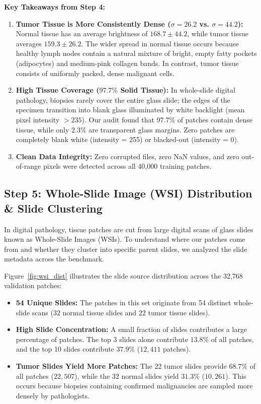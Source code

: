 \documentclass[11pt,a4paper]{article}
\begin{document}
\noindent\textbf{Key Takeaways from Step 4:}
\begin{enumerate}[noitemsep]
    \item \textbf{Tumor Tissue is More Consistently Dense ($\sigma = 26.2$ vs. $\sigma = 44.2$):}
    Normal tissue has an average brightness of $168.7 \pm 44.2$, while tumor tissue averages $159.3 \pm 26.2$. The wider spread in normal tissue occurs because healthy lymph nodes contain a natural mixture of bright, empty fatty pockets (adipocytes) and medium-pink collagen bands. In contrast, tumor tissue consists of uniformly packed, dense malignant cells.
    \item \textbf{High Tissue Coverage ($97.7\%$ Solid Tissue):}
    In whole-slide digital pathology, biopsies rarely cover the entire glass slide; the edges of the specimen transition into blank glass illuminated by white backlight (mean pixel intensity $> 235$). Our audit found that $97.7\%$ of patches contain dense tissue, while only $2.3\%$ are transparent glass margins. Zero patches are completely blank white (intensity = 255) or blacked-out (intensity = 0).
    \item \textbf{Clean Data Integrity:}
    Zero corrupted files, zero NaN values, and zero out-of-range pixels were detected across all 40,000 training patches.
\end{enumerate}

\subsection{Step 5: Whole-Slide Image (WSI) Distribution \& Slide Clustering}
In digital pathology, tissue patches are cut from large digital scans of glass slides known as Whole-Slide Images (WSIs). To understand where our patches come from and whether they cluster into specific parent slides, we analyzed the slide metadata across the benchmark.

Figure~\ref{fig:wsi_dist} illustrates the slide source distribution across the 32,768 validation patches:
\begin{itemize}[noitemsep]
    \item \textbf{54 Unique Slides:} The patches in this set originate from 54 distinct whole-slide scans (32 normal tissue slides and 22 tumor tissue slides).
    \item \textbf{High Slide Concentration:} A small fraction of slides contributes a large percentage of patches. The top 3 slides alone contribute $13.8\%$ of all patches, and the top 10 slides contribute $37.9\%$ ($12,411$ patches).
    \item \textbf{Tumor Slides Yield More Patches:} The 22 tumor slides provide $68.7\%$ of all patches ($22,507$), while the 32 normal slides yield $31.3\%$ ($10,261$). This occurs because biopsies containing confirmed malignancies are sampled more densely by pathologists.
\end{itemize}
\end{document}
